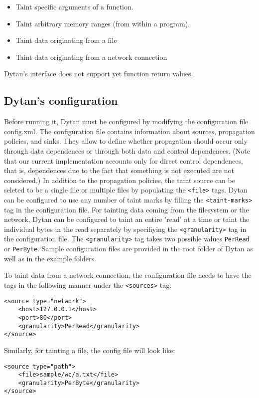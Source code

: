 \documentclass[letterpaper,10pt]{article}
\begin{document}
\begin{itemize}
 \item Taint specific arguments of a function.
 \item Taint arbitrary memory ranges (from within a program).
 \item Taint data originating from a file
 \item Taint data originating from a network connection
\end{itemize}
Dytan's interface does not support yet function return values.

\subsection{Dytan's configuration}

Before running it, Dytan must be configured by modifying the
configuration file config.xml. The configuration file contains
information about sources, propagation policies, and sinks. They allow to define whether propagation
should occur only through data dependences or through both data and
control dependences. (Note that our current implementation accounts
only for direct control dependences, that is, dependences due to the
fact that something is not executed are not considered.) In addition 
to the propagation policies, the taint source can be seleted to be
a single file or multiple files by populating the \verb|<file>| tags. Dytan
can be configured to use any number of taint marks by filling the
\verb|<taint-marks>| tag in the configuration file. For tainting data
coming from the filesystem or the network, Dytan can be configured
to taint an entire 'read' at a time or taint the individual bytes
in the read separately by specifiying the \verb|<granularity>| tag in
the configuration file. The \verb|<granularity>| tag takes two possible
values \verb|PerRead| or \verb|PerByte|. Sample configuration files are provided
in the root folder of Dytan as well as in the example folders.

To taint data from a network connection, the configuration file needs
to have the tags in the following manner under the \verb|<sources>| tag.
\begin{verbatim}
<source type="network">
    <host>127.0.0.1</host>
    <port>80</port>
    <granularity>PerRead</granularity>
</source>
\end{verbatim}

Similarly, for tainting a file, the config file will look like:
\begin{verbatim}
<source type="path">
    <file>sample/wc/a.txt</file>
    <granularity>PerByte</granularity>
</source>
\end{verbatim}
\end{document}
